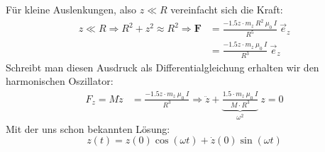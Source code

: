 \documentclass[11pt a4paper]{article}
\begin{document}
Für kleine Auslenkungen, also $z \ll R$ vereinfacht sich die Kraft:
\begin{align*}
	z \ll R \Rightarrow R^2 + z^2 \approx R^2 \Rightarrow
	\mathbf F
	&= \frac{-1.5 z \cdot m_z \ R^2 \ \mu_0 \ I}
	{R^5} \ \vec e_z \\
	&= \frac{-1.5 z \cdot m_z \ \mu_0 \ I}
	{R^3} \ \vec e_z
\end{align*}
Schreibt man diesen Ausdruck als Differentialgleichung erhalten wir den
harmonischen Oszillator:
\begin{align*}
	F_z = M\ddot z 
	&= \frac{-1.5 z \cdot m_z \ \mu_0 \ I}
	{R^3} \Rightarrow
	\ddot z + \underbrace{\frac{1.5\cdot m_z \ \mu_0 \ I}{M \cdot R^3}}
	_{\omega^2} \ z = 0
\end{align*}
Mit der uns schon bekannten Lösung:
\[
	z(t) = z(0) \cos(\omega t) + \dot z(0) \sin(\omega t)
\]
\end{document}
